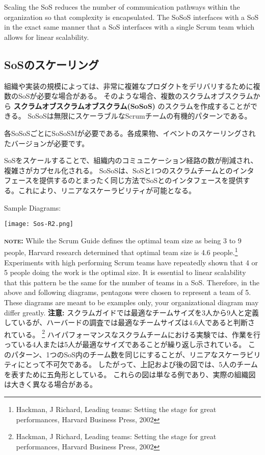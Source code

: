 \documentclass[12pt,a4paper,parskip=full]{scrartcl}
\begin{document}
Scaling the SoS reduces the number of communication pathways within the
organization so that complexity is encapsulated. The SoSoS interfaces with
a SoS in the exact same manner that a SoS interfaces with a single Scrum
team which allows for linear scalability.
\fi
\subsection{SoSのスケーリング}
組織や実装の規模によっては、非常に複雑なプロダクトをデリバリするために複数のSoSが必要な場合がある。
そのような場合、複数のスクラムオブスクラムから \textbf{スクラムオブスクラムオブスクラム(SoSoS)} のスクラムを作成することができる。
SoSoSは無限にスケーラブルなScrumチームの有機的パターンである。

各SoSoSごとにSoSoSMが必要である。各成果物、イベントのスケーリングされたバージョンが必要です。

SoSをスケールすることで、組織内のコミュニケーション経路の数が削減され、複雑さがカプセル化される。
SoSoSは、SoSと1つのスクラムチームとのインタフェースを提供するのとまったく同じ方法でSoSとのインタフェースを提供する。これにより、リニアなスケーラビリティが可能となる。

\pagebreak
Sample Diagrams:

\texttt{[image: Sos-R2.png]}

\textbf{\textsc{note:}} While the Scrum Guide defines the optimal team size as being
3 to 9 people, Harvard research determined that optimal team size is 4.6
people.\footnote{Hackman, J Richard, Leading teams: Setting the stage for
great performances, Harvard Business Press, 2002} Experiments with high
performing Scrum teams have repeatedly shown that 4 or 5 people doing the
work is the optimal size. It is essential to linear scalability that this
pattern be the same for the number of teams in a SoS. Therefore, in the
above and following diagrams, pentagons were chosen to represent a team of
5. These diagrams are meant to be examples only, your organizational
diagram may differ greatly.
\fi
\textbf{\textsc{注意:}} スクラムガイドでは最適なチームサイズを3人から9人と定義しているが、ハーバードの調査では最適なチームサイズは4.6人であると判断されている。
\footnote{Hackman, J Richard, Leading teams: Setting the stage for great performances, Harvard Business Press, 2002} ハイパフォーマンスなスクラムチームにおける実験では、作業を行っている4人または5人が最適なサイズであることが繰り返し示されている。
このパターン、1つのSoS内のチーム数を同じにすることが、リニアなスケーラビリティにとって不可欠である。
したがって、上記および後の図では、5人のチームを表すために五角形としている。
これらの図は単なる例であり、実際の組織図は大きく異なる場合がある。
\end{document}
